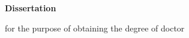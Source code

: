 
\frontmatter

\begin{titlepage}

    \begin{center}

        \vspace*{2\bigskipamount}

        {\makeatletter
            \titlestyle\bfseries\LARGE\@title
            \makeatother}

        {\makeatletter
            \ifx\@subtitle\undefined\else
                \bigskip
                \titlefont\titleshape\Large\@subtitle
            \fi
            \makeatother}

    \end{center}

    \cleardoublepage
    \thispagestyle{empty}

    \begin{center}


        \vspace*{2\bigskipamount}

        {\makeatletter
            \titlestyle\bfseries\LARGE\@title
            \makeatother}

        {\makeatletter
            \ifx\@subtitle\undefined\else
                \bigskip
                \titlefont\titleshape\Large\@subtitle
            \fi
            \makeatother}

        \vfill


        {\Large\titlefont\bfseries Dissertation}

        \bigskip
        \bigskip

        for the purpose of obtaining the degree of doctor


\end{center}
\end{titlepage}
